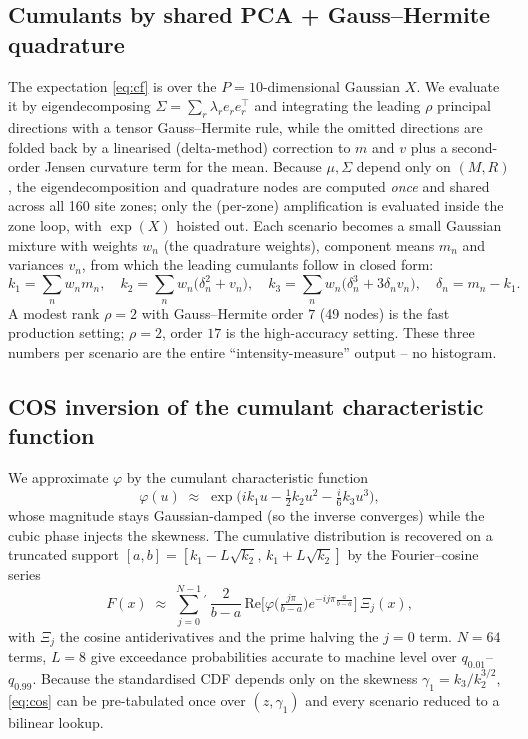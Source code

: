 \documentclass[11pt,a4paper]{article}
\begin{document}
\subsection{Cumulants by shared PCA + Gauss--Hermite quadrature}
The expectation \eqref{eq:cf} is over the $P{=}10$-dimensional Gaussian $X$. We
evaluate it by eigendecomposing $\Sigma=\sum_r \lambda_r e_r e_r^{\!\top}$ and
integrating the leading $\rho$ principal directions with a tensor
Gauss--Hermite rule, while the omitted directions are folded back by a linearised
(delta-method) correction to $m$ and $v$ plus a second-order Jensen curvature
term for the mean. Because $\mu,\Sigma$ depend only on $(M,R)$, the
eigendecomposition and quadrature nodes are computed \emph{once} and shared
across all 160 site zones; only the (per-zone) amplification is evaluated inside
the zone loop, with $\exp(X)$ hoisted out. Each scenario becomes a small Gaussian
mixture with weights $w_n$ (the quadrature weights), component means $m_n$ and
variances $v_n$, from which the leading cumulants follow in closed form:
\begin{equation}
  k_1=\sum_n w_n m_n,\quad
  k_2=\sum_n w_n\!\big(\delta_n^2+v_n\big),\quad
  k_3=\sum_n w_n\!\big(\delta_n^3+3\delta_n v_n\big),\quad
  \delta_n=m_n-k_1.
  \label{eq:cumulants}
\end{equation}
A modest rank $\rho=2$ with Gauss--Hermite order $7$ (49 nodes) is the fast
production setting; $\rho=2$, order $17$ is the high-accuracy setting. These three
numbers per scenario are the entire ``intensity-measure'' output -- no histogram.

\subsection{COS inversion of the cumulant characteristic function}
We approximate $\varphi$ by the cumulant characteristic function
\begin{equation}
  \varphi(u)\;\approx\;\exp\!\Big(i k_1 u-\tfrac12 k_2 u^2-\tfrac{i}{6}k_3 u^3\Big),
  \label{eq:cumcf}
\end{equation}
whose magnitude stays Gaussian-damped (so the inverse converges) while the cubic
phase injects the skewness. The cumulative distribution is recovered on a
truncated support $[a,b]=[k_1-L\sqrt{k_2},\,k_1+L\sqrt{k_2}]$ by the
Fourier--cosine series \cite{fangOosterlee}
\begin{equation}
  F(x)\;\approx\;\sum_{j=0}^{N-1}{}^{\prime}\,
  \frac{2}{b-a}\,\mathrm{Re}\!\Big[\varphi\!\Big(\tfrac{j\pi}{b-a}\Big)
  e^{-i j\pi \frac{a}{b-a}}\Big]\,
  \Xi_j(x),
  \label{eq:cos}
\end{equation}
with $\Xi_j$ the cosine antiderivatives and the prime halving the $j{=}0$ term.
$N=64$ terms, $L=8$ give exceedance probabilities accurate to machine level over
$q_{0.01}$--$q_{0.99}$. Because the standardised CDF depends only on the
skewness $\gamma_1=k_3/k_2^{3/2}$, \eqref{eq:cos} can be pre-tabulated once over
$(z,\gamma_1)$ and every scenario reduced to a bilinear lookup.
\end{document}
